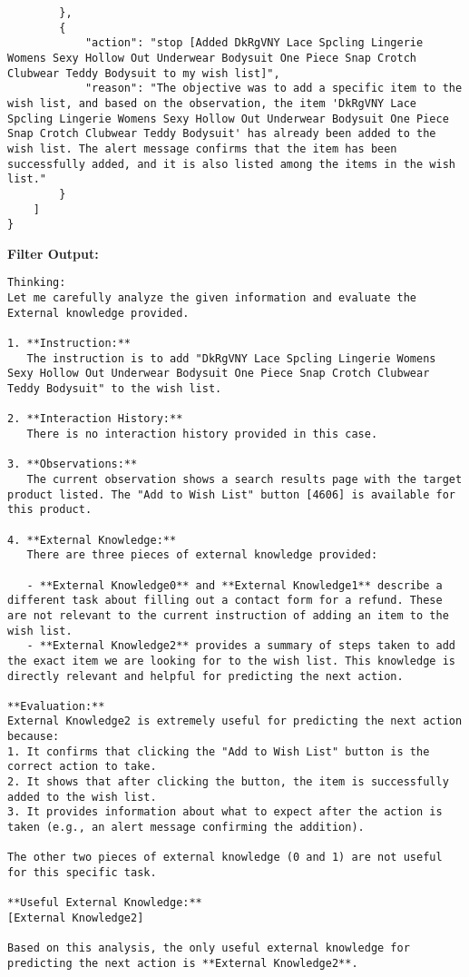 \begin{tcolorbox}[breakable]
\begin{lstlisting}
        },
        {
            "action": "stop [Added DkRgVNY Lace Spcling Lingerie Womens Sexy Hollow Out Underwear Bodysuit One Piece Snap Crotch Clubwear Teddy Bodysuit to my wish list]",
            "reason": "The objective was to add a specific item to the wish list, and based on the observation, the item 'DkRgVNY Lace Spcling Lingerie Womens Sexy Hollow Out Underwear Bodysuit One Piece Snap Crotch Clubwear Teddy Bodysuit' has already been added to the wish list. The alert message confirms that the item has been successfully added, and it is also listed among the items in the wish list."
        }
    ]
}
\end{lstlisting}






\textbf{Filter Output:} 
\begin{lstlisting}
Thinking:
Let me carefully analyze the given information and evaluate the External knowledge provided.

1. **Instruction:**  
   The instruction is to add "DkRgVNY Lace Spcling Lingerie Womens Sexy Hollow Out Underwear Bodysuit One Piece Snap Crotch Clubwear Teddy Bodysuit" to the wish list.

2. **Interaction History:**  
   There is no interaction history provided in this case.

3. **Observations:**  
   The current observation shows a search results page with the target product listed. The "Add to Wish List" button [4606] is available for this product.

4. **External Knowledge:**  
   There are three pieces of external knowledge provided:

   - **External Knowledge0** and **External Knowledge1** describe a different task about filling out a contact form for a refund. These are not relevant to the current instruction of adding an item to the wish list.
   - **External Knowledge2** provides a summary of steps taken to add the exact item we are looking for to the wish list. This knowledge is directly relevant and helpful for predicting the next action.

**Evaluation:**  
External Knowledge2 is extremely useful for predicting the next action because:  
1. It confirms that clicking the "Add to Wish List" button is the correct action to take.  
2. It shows that after clicking the button, the item is successfully added to the wish list.  
3. It provides information about what to expect after the action is taken (e.g., an alert message confirming the addition).  

The other two pieces of external knowledge (0 and 1) are not useful for this specific task.

**Useful External Knowledge:**  
[External Knowledge2]

Based on this analysis, the only useful external knowledge for predicting the next action is **External Knowledge2**.
\end{lstlisting}

\end{tcolorbox}

